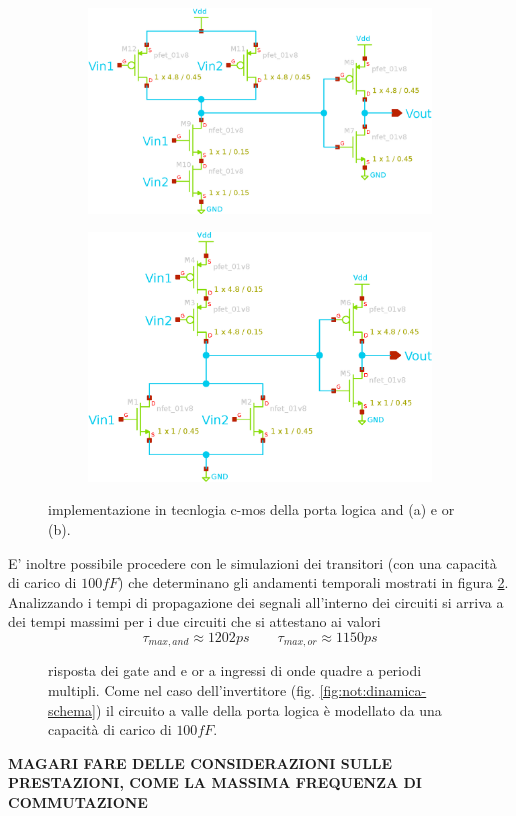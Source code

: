 	\begin{figure}[bht]
	\centering
	\begin{subfigure}{0.48\linewidth}
		\centering \includegraphics[width=0.9\linewidth]{Immagini/and-gate} \caption{}
	\end{subfigure}
	\begin{subfigure}{0.48\linewidth}
		\centering \includegraphics[width=0.9\linewidth]{Immagini/or-gate} \caption{}
	\end{subfigure}
	\caption{implementazione in tecnlogia c-mos della porta logica and (a) e or (b).}
	\label{fig:andor:schematico}
	\end{figure}

	E' inoltre possibile procedere con le simulazioni dei transitori (con una capacità di carico di $100 fF$) che determinano gli andamenti temporali mostrati in figura \ref{fig:andor:dinamica}. Analizzando i tempi di propagazione dei segnali all'interno dei circuiti si arriva a dei tempi massimi per i due circuiti che si attestano ai valori
	\[ \tau_{max,and} \approx 1202 ps \qquad \tau_{max,or} \approx 1150ps  \]


	\begin{figure}[bht]
		\centering
		
		\caption{risposta dei gate and e or a ingressi di onde quadre a periodi multipli. Come nel caso dell'invertitore (fig. \ref{fig:not:dinamica-schema}) il circuito a valle della porta logica è modellato da una capacità di carico di $100fF$.}
		\label{fig:andor:dinamica}
	\end{figure}

\textbf{MAGARI FARE DELLE CONSIDERAZIONI SULLE PRESTAZIONI, COME LA MASSIMA FREQUENZA DI COMMUTAZIONE}
